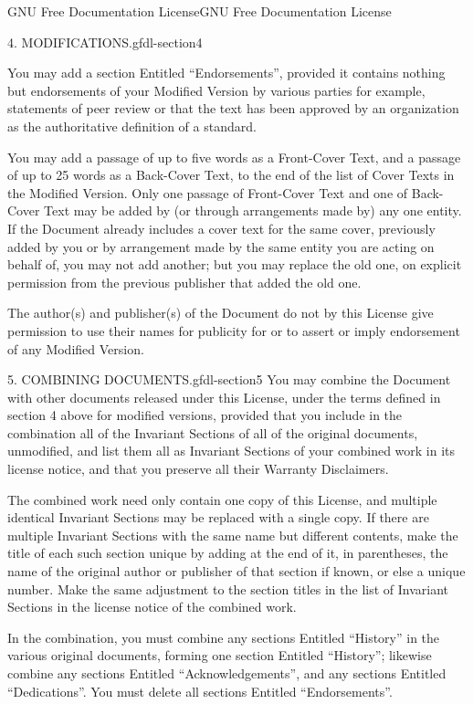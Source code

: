 \documentclass[10pt,]{book}
\numberwithin{equation}{section}
\begin{document}
\begin{appendixptx}{GNU Free Documentation License}{}{GNU Free Documentation License}{}{}
\begin{paragraphs}{4. MODIFICATIONS.}{gfdl-section4}
\par
\hypertarget{p-1346}{}%
You may add a section Entitled ``Endorsements'', provided it contains nothing but endorsements of your Modified Version by various parties \textemdash{} for example, statements of peer review or that the text has been approved by an organization as the authoritative definition of a standard.%
\par
\hypertarget{p-1347}{}%
You may add a passage of up to five words as a Front-Cover Text, and a passage of up to 25 words as a Back-Cover Text, to the end of the list of Cover Texts in the Modified Version. Only one passage of Front-Cover Text and one of Back-Cover Text may be added by (or through arrangements made by) any one entity. If the Document already includes a cover text for the same cover, previously added by you or by arrangement made by the same entity you are acting on behalf of, you may not add another; but you may replace the old one, on explicit permission from the previous publisher that added the old one.%
\par
\hypertarget{p-1348}{}%
The author(s) and publisher(s) of the Document do not by this License give permission to use their names for publicity for or to assert or imply endorsement of any Modified Version.%
\end{paragraphs}%
\begin{paragraphs}{5. COMBINING DOCUMENTS.}{gfdl-section5}%
\hypertarget{p-1349}{}%
You may combine the Document with other documents released under this License, under the terms defined in section 4 above for modified versions, provided that you include in the combination all of the Invariant Sections of all of the original documents, unmodified, and list them all as Invariant Sections of your combined work in its license notice, and that you preserve all their Warranty Disclaimers.%
\par
\hypertarget{p-1350}{}%
The combined work need only contain one copy of this License, and multiple identical Invariant Sections may be replaced with a single copy. If there are multiple Invariant Sections with the same name but different contents, make the title of each such section unique by adding at the end of it, in parentheses, the name of the original author or publisher of that section if known, or else a unique number. Make the same adjustment to the section titles in the list of Invariant Sections in the license notice of the combined work.%
\par
\hypertarget{p-1351}{}%
In the combination, you must combine any sections Entitled ``History'' in the various original documents, forming one section Entitled ``History''; likewise combine any sections Entitled ``Acknowledgements'', and any sections Entitled ``Dedications''. You must delete all sections Entitled ``Endorsements''.%

\end{paragraphs}
\end{appendixptx}
\end{document}

